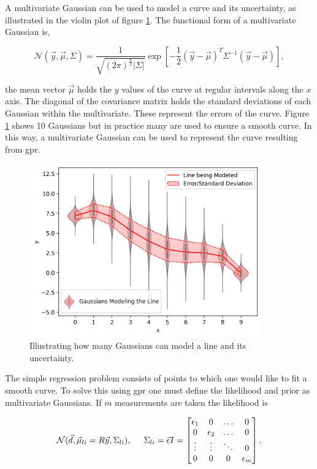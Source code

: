 A multivariate Gaussian can be used to model a curve and its uncertainty, as illustrated in the violin plot of figure \ref{fig:mvg}. The functional form of a multivariate Gaussian is,

\begin{equation}
  \mathcal{N}(\vec y, \vec{\mu}, \Sigma) = \frac{1}{\sqrt{(2\pi)^{\frac{n}{2}}|\Sigma|}} \exp \left[{{-\frac{1}{2}(\vec{y}-\vec{\mu})^T\Sigma^{-1}(\vec{y}-\vec{\mu})}}\right],
  \label{eq:mvg}
\end{equation}

\noindent the mean vector $\vec{\mu}$ holds the $y$ values of the curve at regular intervals along the $x$ axis. The diagonal of the covariance matrix holds the standard deviations of each Gaussian within the multivariate. These represent the errors of the curve. Figure \ref{fig:mvg} shows 10 Gaussians but in practice many are used to ensure a smooth curve. In this way, a multivariate Gaussian can be used to represent the curve resulting from \gls{gpr}.

\begin{figure}
  \centering
  \includegraphics[width=10cm]{images/mvg.png}
  \caption{Illustrating how many Gaussians can model a line and its uncertainty.}
  \label{fig:mvg}
\end{figure}

The simple regression problem consists of points to which one would like to fit a smooth curve. To solve this using \gls{gpr} one must define the likelihood and prior as multivariate Gaussians. If $m$ measurements are taken the likelihood is

\begin{equation}
  \mathcal{N}(\vec{d}, \vec \mu_{li} = R\vec{y}, \Sigma_{li}),\hspace{0.5cm} \Sigma_{li} = \vec{\epsilon}I = 
    \begin{bmatrix}
        \epsilon_1 & 0 & \hdots & 0\\
        0 & \epsilon_2 & \hdots & 0\\
        \vdots & \vdots & \ddots & 0 \\
        0 & 0 & 0 &\epsilon_m
    \end{bmatrix},
  \label{eq:likelihood}
\end{equation}

